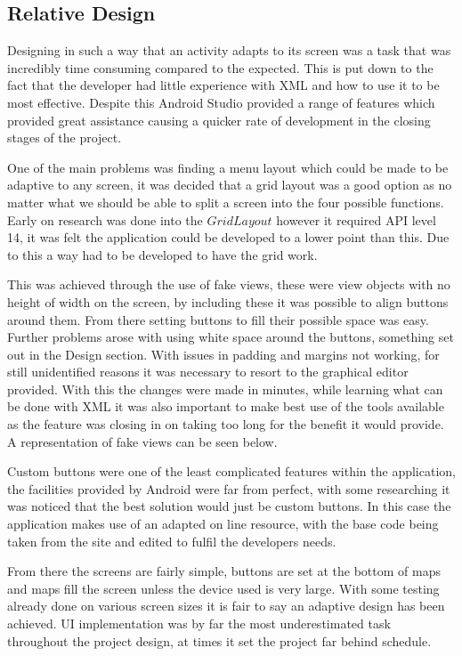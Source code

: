 \subsection{Relative Design}
Designing in such a way that an activity adapts to its screen was a task that was incredibly time consuming compared to the expected. This is put down to the fact that the developer had little experience with XML and how to use it to be most effective. Despite this Android Studio provided a range of features which provided great assistance causing a quicker rate of development in the closing stages of the project.

One of the main problems was finding a menu layout which could be made to be adaptive to any screen, it was decided that a grid layout was a good option as no matter what we should be able to split a screen into the four possible functions. Early on research was done into the $GridLayout$ however it required API level 14, it was felt the application could be developed to a lower point than this. Due to this a way had to be developed to have the grid work.

This was achieved through the use of fake views, these were view objects with no height of width on the screen, by including these it was possible to align buttons around them. From there setting buttons to fill their possible space was easy. Further problems arose with using white space around the buttons, something set out in the Design section. With issues in padding and margins not working, for still unidentified reasons it was necessary to resort to the graphical editor provided. With this the changes were made in minutes, while learning what can be done with  XML it was also important to make best use of the tools available as the feature was closing in on taking too long for the benefit it would provide. A representation of fake views can be seen below. 

Custom buttons were one of the least complicated features within the application, the facilities provided by Android were far from perfect, with some researching it was noticed that the best solution would just be custom buttons. In this case the application makes use of an adapted on line resource\cite{button}, with the base code being taken from the site and edited to fulfil the developers needs. 

From there the screens are fairly simple, buttons are set at the bottom of maps and maps fill the screen unless the device used is very large. With some testing already done on various screen sizes it is fair to say an adaptive design has been achieved. UI implementation was by far the most underestimated task throughout the project design, at times it set the project far behind schedule. 
